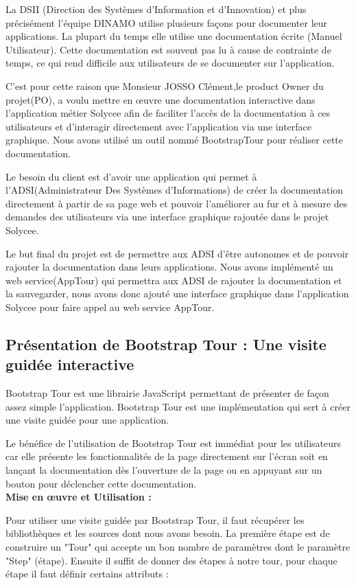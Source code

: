 \documentclass[12pt]{article}
\begin{document}
La DSII (Direction des Systèmes d'Information et d'Innovation) et plus précisément l'équipe DINAMO utilise plusieurs façons pour documenter leur applications. La plupart du temps elle utilise une documentation écrite (Manuel Utilisateur). Cette documentation est souvent pas lu à cause de contrainte de temps, ce qui rend difficile aux utilisateurs de se documenter sur l'application.


C'est pour cette raison que Monsieur JOSSO Clément,le product Owner du projet(PO), a voulu mettre en œuvre une documentation interactive dans l'application métier Solycee afin de faciliter l’accès de la documentation à ces utilisateurs et d'interagir directement avec l'application via une interface graphique. Nous avons utilisé un outil nommé BootstrapTour pour réaliser cette documentation. 

Le besoin du client est d'avoir une application qui permet à l'ADSI(Administrateur Des Systèmes d'Informations) de créer la documentation directement à partir de sa page web et pouvoir l'améliorer au fur et à mesure des demandes des utilisateurs via une interface graphique rajoutée dans le projet Solycee. 


Le but final du projet est de permettre aux ADSI d'être autonomes et de pouvoir rajouter la documentation dans leurs applications. Nous avons implémenté un web service(AppTour) qui permettra aux ADSI de rajouter la documentation et la sauvegarder, nous avons donc ajouté une interface graphique dans l'application Solycee pour faire appel au web service AppTour.
 
\subsection{Présentation de Bootstrap Tour : Une visite guidée interactive}
 
Bootstrap Tour est une librairie JavaScript permettant de présenter de façon assez simple l’application. Bootstrap Tour est une implémentation qui sert à créer une visite guidée pour une application.

Le bénéfice de l'utilisation de Bootstrap Tour est immédiat pour les utilisateurs car elle présente les fonctionnalités de la page directement sur l'écran soit en lançant la documentation  dès l'ouverture de la page ou en appuyant sur un bouton pour déclencher cette documentation.\\
\textbf{Mise en œuvre et  Utilisation :}

Pour utiliser une visite guidée par Bootstrap Tour, il faut récupérer les bibliothèques et les sources dont nous avons besoin. La première étape est de construire un "Tour" qui accepte un bon nombre de paramètres dont le paramètre "Step" (étape). Ensuite il suffit de donner des étapes à notre tour, pour chaque étape il faut définir certains attributs : 
\end{document}
